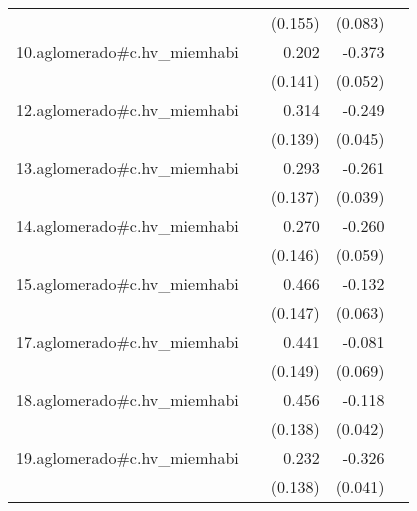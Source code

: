 {\begin{longtable}{l*{4}{D{.}{.}{-1}}}
            &                     &     (0.155)         &     (0.083)         &                     \\
\addlinespace
10.aglomerado#c.hv\_miemhabi&                     &       0.202         &      -0.373\sym{***}&                     \\
            &                     &     (0.141)         &     (0.052)         &                     \\
\addlinespace
12.aglomerado#c.hv\_miemhabi&                     &       0.314\sym{*}  &      -0.249\sym{***}&                     \\
            &                     &     (0.139)         &     (0.045)         &                     \\
\addlinespace
13.aglomerado#c.hv\_miemhabi&                     &       0.293\sym{*}  &      -0.261\sym{***}&                     \\
            &                     &     (0.137)         &     (0.039)         &                     \\
\addlinespace
14.aglomerado#c.hv\_miemhabi&                     &       0.270         &      -0.260\sym{***}&                     \\
            &                     &     (0.146)         &     (0.059)         &                     \\
\addlinespace
15.aglomerado#c.hv\_miemhabi&                     &       0.466\sym{**} &      -0.132\sym{*}  &                     \\
            &                     &     (0.147)         &     (0.063)         &                     \\
\addlinespace
17.aglomerado#c.hv\_miemhabi&                     &       0.441\sym{**} &      -0.081         &                     \\
            &                     &     (0.149)         &     (0.069)         &                     \\
\addlinespace
18.aglomerado#c.hv\_miemhabi&                     &       0.456\sym{***}&      -0.118\sym{**} &                     \\
            &                     &     (0.138)         &     (0.042)         &                     \\
\addlinespace
19.aglomerado#c.hv\_miemhabi&                     &       0.232         &      -0.326\sym{***}&                     \\
            &                     &     (0.138)         &     (0.041)         &                     \\

\end{longtable}}
